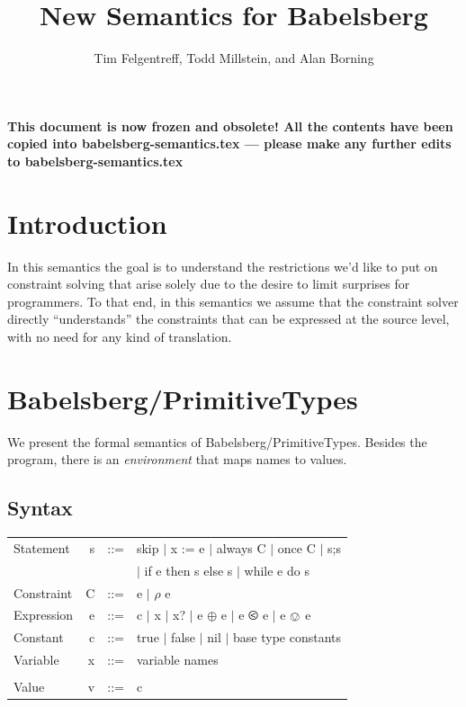 \documentclass{article}
\begin{document}
\title{New Semantics for Babelsberg}
\author{Tim Felgentreff, Todd Millstein, and Alan Borning}
\date{}


\maketitle

{\Large\bf This document is now frozen and obsolete!  All the contents
  have been copied into babelsberg-semantics.tex --- please make any
  further edits to babelsberg-semantics.tex}

\section{Introduction}

In this semantics the goal is to understand the restrictions we'd like
to put on constraint solving that arise solely due to the desire to
limit surprises for programmers.  To that end, in this semantics we
assume that the constraint solver directly ``understands'' the
constraints that can be expressed at the source level, with no need
for any kind of translation.


\section{Babelsberg/PrimitiveTypes}
\label{sec:babelsberg/int}


We present the formal semantics of Babelsberg/PrimitiveTypes. Besides
the program, there is an \emph{environment} that maps names to values.

\subsection{Syntax}
\label{sec:babelsberg-primitivetypes-syntax}

\begin{tt}
\begin{tabular}{lrrl}
{\rm Statement} & s & ::= & skip $\mid$ x := e $\mid$ always C $\mid$ once C $\mid$ s;s \\
  & & & $\mid$ if e then s else s $\mid$ while e do s \\
{\rm Constraint} & C & ::= & e $\mid$ $\rho$ e \\
{\rm Expression} & e & ::= & c $\mid$ x $\mid$ x? $\mid$ e $\oplus$ e  $\mid$ e $\olessthan$ e $\mid$ e $\ovee$ e\\
{\rm Constant} & c & ::= & true $\mid$ false $\mid$ nil $\mid$ {\rm base type constants}\\
{\rm Variable} & x & ::= & {\rm variable names} \\\\

{\rm Value} & v & ::= & c
\end{tabular}
\end{tt}
\end{document}
